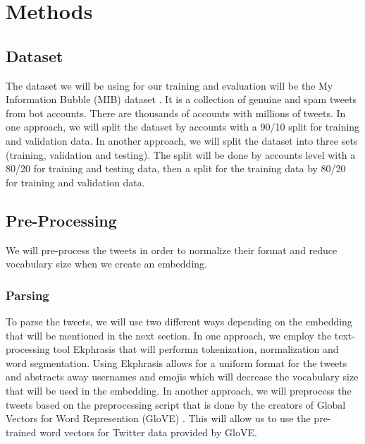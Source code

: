 \section{Methods}
\label{sec:methods}

\subsection{Dataset} The dataset we will be using for our training and
evaluation will be the My Information Bubble (MIB) dataset
\citep{Cresci:2017:PSS:3041021.3055135}. It is a collection of genuine
and spam tweets from bot accounts. There are thousands of accounts
with millions of tweets. In one approach, we will split the dataset by accounts with a
90/10 split for training and validation data. In another approach, we will split the dataset into three sets (training, validation and testing). The split will be done by accounts level with a 80/20 for training and testing data, then a split for the training data by 80/20 for training and validation data. 

\subsection{Pre-Processing} We will pre-process the tweets in order to
normalize their format and reduce vocabulary size when we create an
embedding.

\subsubsection{Parsing} To parse the tweets, we will use two different ways depending on the embedding that will be mentioned in the next section. In one approach, we employ the
text-processing tool Ekphrasis
\citep{baziotis-pelekis-doulkeridis:2017:SemEval2} that will performn
tokenization, normalization and word segmentation. Using Ekphrasis
allows for a uniform format for the tweets and abstracts away
usernames and emojis which will decrease the vocabulary size that will
be used in the embedding. In another approach, we will preprocess the tweets based on the preprocessing script that is done by the creators of Global Vectors for Word Represention (GloVE) \citep{pennington-etal-2014-glove}. This will allow us to use the pre-trained word vectors for Twitter data provided by GloVE. 


